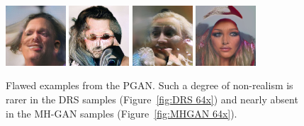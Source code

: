 \documentclass{article}
\begin{document}
\begin{figure}[htbp]
    \centering
       \includegraphics[width=0.2\textwidth]{figures/pgan/4_base_iso_base.jpg}
    \hfill
       \includegraphics[width=0.2\textwidth]{figures/pgan/5_base_iso_base.jpg}
    \hfill
       \includegraphics[width=0.2\textwidth]{figures/pgan/8_base_iso_base.jpg}
    \hfill
       \includegraphics[width=0.2\textwidth]{figures/pgan/34_base_iso_base.jpg}
    \caption{
    Flawed examples from the PGAN\@.
    Such a degree of non-realism is rarer in the DRS samples (Figure~\ref{fig:DRS 64x}) and nearly absent in the MH-GAN samples (Figure~\ref{fig:MHGAN 64x})\@.
    }
\end{figure}
\end{document}
